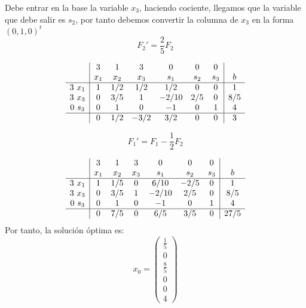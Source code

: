 \documentclass[11pt,fleqn]{book} %
\begin{document}
Debe entrar en la base la variable $x_3$, haciendo cociente, llegamos que la variable que debe salir es $s_2$, por tanto debemos convertir la columna de $x_3$ en la forma $(0, 1, 0)^t$
$$F_2'=\frac{2}{5}F_2$$

$$
\begin{array}{c|cccccc|c}
& 3 & 1 & 3 & 0 & 0 & 0 &  \\
& x_1 & x_2 & x_3 & s_1 & s_2 & s_3 & b \\ \hline
3 ~ x_1 & 1 & 1/2 & 1/2 & 1/2 & 0 & 0 & 1 \\
3 ~ x_3 & 0 & 3/5 & 1 & -2/10 & 2/5 & 0 & 8/5 \\
0 ~ s_3 & 0 & 1 & 0 & -1 & 0 & 1 & 4 \\ \hline
& 0 & 1/2 & -3/2 & 3/2 & 0 & 0 & 3
\end{array}
$$

$$
F_1'=F_1-\frac{1}{2}F_2$$$  $

$$
\begin{array}{c|cccccc|c}
& 3 & 1 & 3 & 0 & 0 & 0 &  \\
& x_1 & x_2 & x_3 & s_1 & s_2 & s_3 & b \\ \hline
3 ~ x_1 & 1 & 1/5 & 0 & 6/10 & -2/5 & 0 & 1 \\
3 ~ x_3 & 0 & 3/5 & 1 & -2/10 & 2/5 & 0 & 8/5 \\
0 ~ s_3 & 0 & 1 & 0 & -1 & 0 & 1 & 4 \\ \hline
& 0 &  7/5 & 0 & 6/5 & 3/5 & 0 & 27/5
\end{array}
$$
Por tanto, la solución óptima es:
$$ x_0=\left(
\begin{array}{c}
\displaystyle \frac{1}{5} \\
0 \\
\displaystyle \frac{8}{5} \\
0 \\
0 \\
4
\end{array}
\right)
$$
\end{document}
